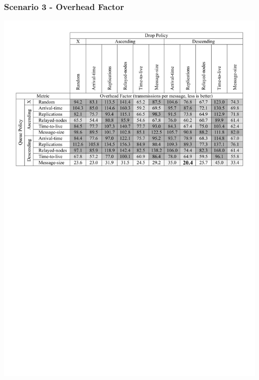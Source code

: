 \begin{frame}
  \frametitle{Scenario 3 - Overhead Factor}
  \begin{center}
   \includegraphics[width=1.0\textwidth]{fig/tables/scenario3_part2.pdf}
  \end{center}
\end{frame}

